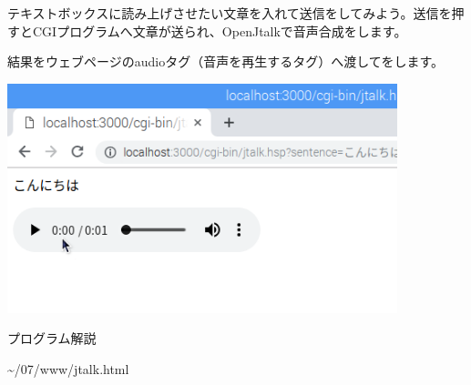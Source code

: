 \documentclass[a4paper,12pt,dvipdfmx]{jarticle}
\begin{document}
テキストボックスに読み上げさせたい文章を入れて送信をしてみよう。送信を押すとCGIプログラムへ文章が送られ、OpenJtalkで音声合成をします。


\bigskip

結果をウェブページのaudioタグ（音声を再生するタグ）へ渡してをします。

%
%


\centering
\includegraphics[width=0.85\textwidth]{ome7-img057.png}
\flushleft

\clearpage
プログラム解説

{\textasciitilde}/07/www/jtalk.html
\end{document}
